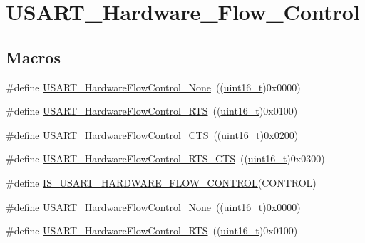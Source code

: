 \hypertarget{group___u_s_a_r_t___hardware___flow___control}{}\section{U\+S\+A\+R\+T\+\_\+\+Hardware\+\_\+\+Flow\+\_\+\+Control}
\label{group___u_s_a_r_t___hardware___flow___control}
\subsection*{Macros}
\begin{DoxyCompactItemize}
\item 
\#define \hyperlink{group___u_s_a_r_t___hardware___flow___control_gaf3deaf4429b88db7753ee203f4797bd3}{U\+S\+A\+R\+T\+\_\+\+Hardware\+Flow\+Control\+\_\+\+None}~((\hyperlink{_p_e___types_8h_a1f1825b69244eb3ad2c7165ddc99c956}{uint16\+\_\+t})0x0000)
\item 
\#define \hyperlink{group___u_s_a_r_t___hardware___flow___control_ga22d4339693e3356d992abca259b0418e}{U\+S\+A\+R\+T\+\_\+\+Hardware\+Flow\+Control\+\_\+\+R\+TS}~((\hyperlink{_p_e___types_8h_a1f1825b69244eb3ad2c7165ddc99c956}{uint16\+\_\+t})0x0100)
\item 
\#define \hyperlink{group___u_s_a_r_t___hardware___flow___control_ga4d989f112f94009c0849fe4dbe829d81}{U\+S\+A\+R\+T\+\_\+\+Hardware\+Flow\+Control\+\_\+\+C\+TS}~((\hyperlink{_p_e___types_8h_a1f1825b69244eb3ad2c7165ddc99c956}{uint16\+\_\+t})0x0200)
\item 
\#define \hyperlink{group___u_s_a_r_t___hardware___flow___control_ga2986aed8c6cba414ac8afe0180ab553e}{U\+S\+A\+R\+T\+\_\+\+Hardware\+Flow\+Control\+\_\+\+R\+T\+S\+\_\+\+C\+TS}~((\hyperlink{_p_e___types_8h_a1f1825b69244eb3ad2c7165ddc99c956}{uint16\+\_\+t})0x0300)
\item 
\#define \hyperlink{group___u_s_a_r_t___hardware___flow___control_ga9b905eb465780173a2e98bc8b602c030}{I\+S\+\_\+\+U\+S\+A\+R\+T\+\_\+\+H\+A\+R\+D\+W\+A\+R\+E\+\_\+\+F\+L\+O\+W\+\_\+\+C\+O\+N\+T\+R\+OL}(C\+O\+N\+T\+R\+OL)
\item 
\#define \hyperlink{group___u_s_a_r_t___hardware___flow___control_gaf3deaf4429b88db7753ee203f4797bd3}{U\+S\+A\+R\+T\+\_\+\+Hardware\+Flow\+Control\+\_\+\+None}~((\hyperlink{_p_e___types_8h_a1f1825b69244eb3ad2c7165ddc99c956}{uint16\+\_\+t})0x0000)
\item 
\#define \hyperlink{group___u_s_a_r_t___hardware___flow___control_ga22d4339693e3356d992abca259b0418e}{U\+S\+A\+R\+T\+\_\+\+Hardware\+Flow\+Control\+\_\+\+R\+TS}~((\hyperlink{_p_e___types_8h_a1f1825b69244eb3ad2c7165ddc99c956}{uint16\+\_\+t})0x0100)

\end{DoxyCompactItemize}
